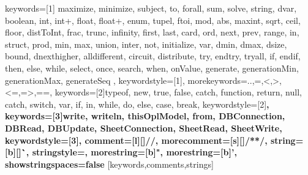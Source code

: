 %
{
  keywords=[1]{
    maximize, minimize, subject, to, forall, sum, solve, string, dvar, boolean, int, int+, float, float+, enum, tupel, ftoi, mod, abs, maxint, sqrt, ceil, floor, distToInt, frac, trunc, infinity, first, last, card, ord, next, prev, range, in, struct, prod, min, max, union, inter, not, initialize, var, dmin, dmax, dsize, bound, dnexthigher, alldifferent, circuit, distribute, try, endtry, tryall, if, endif, then, else, while, select, once, search, when, onValue, generate, generationMin, generationMax, generateSeq
  },
  keywordstyle=[1]\color{eclipse-keywords},
  morekeywords={..,=,<,>,<=,=>,==},
  keywords=[2]{typeof, new, true, false, catch, function, return, null, catch, switch, var, if, in, while, do, else, case, break},
  keywordstyle=[2]\color{orange}\bfseries,
  keywords=[3]{write, writeln, thisOplModel, from, DBConnection, DBRead, DBUpdate, SheetConnection, SheetRead, SheetWrite},
  keywordstyle=[3]\color{RedViolet}\bfseries,
  comment=[l][\color{eclipse-comments}]{//},%
  morecomment=[s][\color{eclipse-comments}]{/*}{*/},%
  string=[b][\color{eclipse-strings}]\``,%
  stringstyle=\color{mymauve}\ttfamily,
  morestring=[b]",%
  morestring=[b]',%
  showstringspaces=false
}[keywords,comments,strings]%


